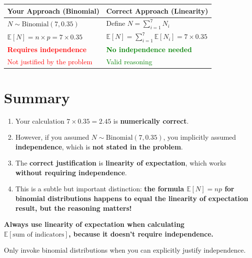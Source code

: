 \documentclass[11pt]{article}
\begin{document}
\begin{center}
\begin{tabular}{|p{}|p{}|}
\hline
\textbf{Your Approach (Binomial)} & \textbf{Correct Approach (Linearity)} \\
\hline
$N \sim \text{Binomial}(7, 0.35)$ & Define $N = \sum_{i=1}^{7} N_i$ \\
\hline
$\mathbb{E}[N] = n \times p = 7 \times 0.35$ & $\mathbb{E}[N] = \sum_{i=1}^{7} \mathbb{E}[N_i] = 7 \times 0.35$ \\
\hline
\textcolor{red}{\textbf{Requires independence}} & \textcolor{green}{\textbf{No independence needed}} \\
\hline
\textcolor{red}{Not justified by the problem} & \textcolor{green}{Valid reasoning} \\
\hline
\end{tabular}
\end{center}

\section*{Summary}

\begin{enumerate}[leftmargin=*]
    \item Your calculation $7 \times 0.35 = 2.45$ is \textbf{numerically correct}.

    \item However, if you assumed $N \sim \text{Binomial}(7, 0.35)$, you implicitly assumed \textbf{independence}, which is \textbf{not stated in the problem}.

    \item The \textbf{correct justification} is \textbf{linearity of expectation}, which works \textbf{without requiring independence}.

    \item This is a subtle but important distinction: \textbf{the formula $\mathbb{E}[N] = np$ for binomial distributions happens to equal the linearity of expectation result, but the reasoning matters!}
\end{enumerate}

\begin{tcolorbox}[colback=blue!10, colframe=blue!50!black, title=Takeaway]
\textbf{Always use linearity of expectation when calculating $\mathbb{E}[\text{sum of indicators}]$, because it doesn't require independence.}

Only invoke binomial distributions when you can explicitly justify independence.
\end{tcolorbox}
\end{document}

